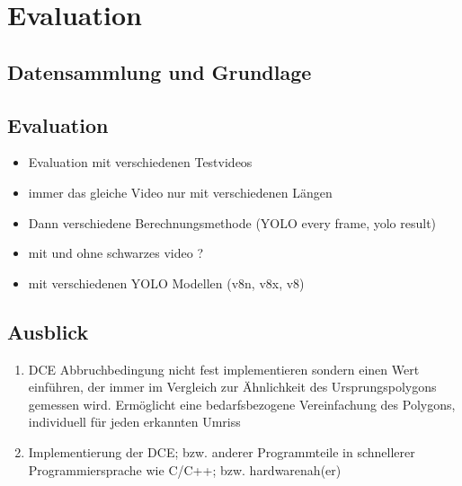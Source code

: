 \chapter{Evaluation}
\label{ch:Evaluation}

\section{Datensammlung und Grundlage}
\section{Evaluation}
{
	\begin{itemize}
		\item Evaluation mit verschiedenen Testvideos
		\item immer das gleiche Video nur mit verschiedenen Längen
		\item Dann verschiedene Berechnungsmethode (YOLO every frame, yolo result)
		\item mit und ohne schwarzes video ?
		\item mit verschiedenen YOLO Modellen (v8n, v8x, v8)
	\end{itemize}

}


\section{Ausblick}
\begin{enumerate}
	\item DCE Abbruchbedingung nicht fest implementieren sondern einen Wert einführen, der immer im Vergleich zur Ähnlichkeit des Ursprungspolygons gemessen wird. Ermöglicht eine bedarfsbezogene Vereinfachung des Polygons, individuell für jeden erkannten Umriss
	\item Implementierung der DCE; bzw. anderer Programmteile in schnellerer Programmiersprache wie C/C++; bzw. hardwarenah(er)
\end{enumerate}



